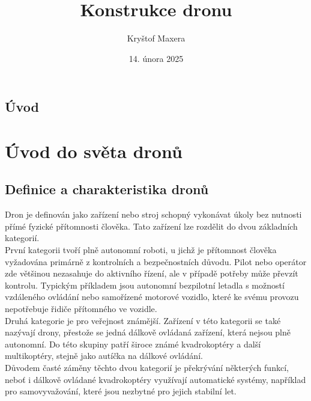\documentclass[12pt]{report}
\author{Kryštof Maxera}                  %
\title{Konstrukce dronu}    %
\date{14. února 2025}                 %
\begin{document}
	\mytitlepage						%
	
	
	
	\podekovani{
		\lipsum[2]						%
	}
	
   {\tableofcontents\newpage}			%
	
\addtocounter{page}{1}		%
\chapter*{Úvod}     %
	
\lipsum[1]	
	
\part[Úvod do světa dronů]{Úvod do světa dronů}  %

\chapter[Definice a charakteristika dronů]{Definice a charakteristika dronů}

Dron je definován jako zařízení nebo stroj schopný vykonávat úkoly bez nutnosti přímé fyzické přítomnosti člověka. Tato zařízení lze rozdělit do dvou základních kategorií.\\
První kategorii tvoří plně autonomní roboti, u jichž je přítomnost člověka vyžadována primárně z kontrolních a bezpečnostních důvodu. Pilot nebo operátor zde většinou nezasahuje do aktivního řízení, ale v případě potřeby může převzít kontrolu. Typickým příkladem jsou autonomní bezpilotní letadla s možností vzdáleného ovládání nebo samořízené motorové vozidlo, které ke svému provozu nepotřebuje řidiče přítomného ve vozidle.\\
Druhá kategorie je pro veřejnost známější. Zařízení v této kategorii se také nazývají drony, přestože se jedná dálkově ovládaná zařízení, která nejsou plně autonomní. Do této skupiny patří široce známé kvadrokoptéry a další multikoptéry, stejně jako autíčka na dálkové ovládání.\\
Důvodem časté záměny těchto dvou kategorií je překrývání některých funkcí, neboť i dálkově ovládané kvadrokoptéry využívají automatické systémy, například pro samovyvažování, které jsou nezbytné pro jejich stabilní let.\cite{mainbook}\\
\end{document}
